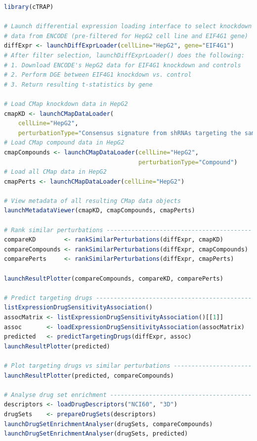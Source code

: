 \begin{lstlisting}[caption=Calling cTRAP's graphical interface functions in an R script.,label={lst:cTRAP-graphical},language=R,morekeywords={include, launchDiffExprLoader},keywordstyle=\bfseries]
library(cTRAP)

# Launch differential expression loading interface to select knockdown
# data from ENCODE (pre-filtered for HepG2 cell line and EIF4G1 gene)
diffExpr <- launchDiffExprLoader(cellLine="HepG2", gene="EIF4G1")
# After filter selection, launchDiffExprLoader() does the following:
# 1. Download ENCODE's HepG2 data for EIF4G1 knockdown and controls
# 2. Perform DGE between EIF4G1 knockdown vs. control
# 3. Return resulting t-statistics by gene

# Load CMap knockdown data in HepG2
cmapKD <- launchCMapDataLoader(
    cellLine="HepG2",
    perturbationType="Consensus signature from shRNAs targeting the same gene")
# Load CMap compound data in HepG2
cmapCompounds <- launchCMapDataLoader(cellLine="HepG2",
                                      perturbationType="Compound")
# Load all CMap data in HepG2
cmapPerts <- launchCMapDataLoader(cellLine="HepG2")

# View metadata of all resulting CMap data objects
launchMetadataViewer(cmapKD, cmapCompounds, cmapPerts)

# Rank similar perturbations -----------------------------------------
compareKD        <- rankSimilarPerturbations(diffExpr, cmapKD)
compareCompounds <- rankSimilarPerturbations(diffExpr, cmapCompounds)
comparePerts     <- rankSimilarPerturbations(diffExpr, cmapPerts)

launchResultPlotter(compareCompounds, compareKD, comparePerts)

# Predict targeting drugs --------------------------------------------
listExpressionDrugSensitivityAssociation()
assocMatrix <- listExpressionDrugSensitivityAssociation()[[1]]
assoc       <- loadExpressionDrugSensitivityAssociation(assocMatrix)
predicted   <- predictTargetingDrugs(diffExpr, assoc)
launchResultPlotter(predicted)

# Plot targeting drugs vs similar perturbations ----------------------
launchResultPlotter(predicted, compareCompounds)

# Analyse drug set enrichment ----------------------------------------
descriptors <- loadDrugDescriptors("NCI60", "3D")
drugSets    <- prepareDrugSets(descriptors)
launchDrugSetEnrichmentAnalyser(drugSets, compareCompounds)
launchDrugSetEnrichmentAnalyser(drugSets, predicted)
\end{lstlisting}

